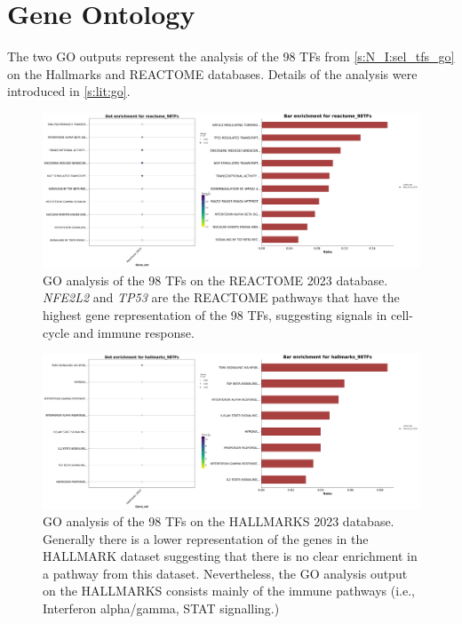 
\section{Gene Ontology} \label{s:ap:N_I:go}

The two GO outputs represent the analysis of the 98 TFs from \cref{s:N_I:sel_tfs_go} on the Hallmarks and REACTOME databases. Details of the analysis were introduced in \cref{s:lit:go}.


\begin{figure}[!htb]
    \centering
    \includegraphics[width=1.0\textwidth,keepaspectratio]{Sections/Network_I/Resources/selective_pruning/go/reactome_98TFs_dualPlot.png}
    \caption[GO analysis of the 98 TF querying REACTOME]{GO analysis of the 98 TFs on the REACTOME 2023 database. \textit{NFE2L2} and \textit{TP53} are the REACTOME pathways that have the highest gene representation of the 98 TFs, suggesting signals in cell-cycle and immune response. }
    \label{fig:ap:sel_tfs_go_reactome}
\end{figure}


\begin{figure}[!htb]
    \centering
    \includegraphics[width=1.0\textwidth,keepaspectratio]{Sections/Network_I/Resources/selective_pruning/go/hallmarks_98TFs_dualPlot.png}
    \caption[GO analysis of the 98 TF querying HALLMARKS]{GO analysis of the 98 TFs on the HALLMARKS 2023 database. Generally there is a lower representation of the genes in the HALLMARK dataset suggesting that there is no clear enrichment in a pathway from this dataset. Nevertheless, the GO analysis output on the HALLMARKS consists mainly of the immune pathways (i.e., Interferon alpha/gamma, STAT signalling.)}
    \label{fig:ap:sel_tfs_go_hallmarks}
\end{figure}


